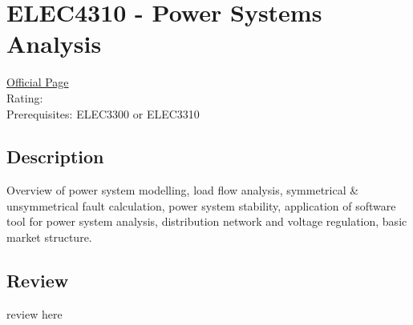 \hypertarget{ELEC4310}{\section{ELEC4310 - Power Systems Analysis}}

\large
\textcolor{turbo_purple}{\href{https://my.uq.edu.au/programs-courses/course.html?course_code=ELEC4310}{Official Page}} \\
Rating: \cstar\cstar\cstar\cstar\ostar \\
Prerequisites: ELEC3300 or ELEC3310

\normalsize
\subsection*{Description}
Overview of power system modelling, load flow analysis, symmetrical \& unsymmetrical fault calculation, power system stability, application of software tool for power system analysis, distribution network and voltage regulation, basic market structure.

\subsection*{Review}
review here
